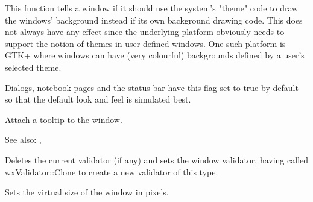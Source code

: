 




\label{wxwindowsetthemeenabled}


This function tells a window if it should use the system's "theme" code
to draw the windows' background instead if its own background drawing
code. This does not always have any effect since the underlying platform
obviously needs to support the notion of themes in user defined windows.
One such platform is GTK+ where windows can have (very colourful) backgrounds
defined by a user's selected theme.

Dialogs, notebook pages and the status bar have this flag set to true
by default so that the default look and feel is simulated best.


\label{wxwindowsettooltip}



Attach a tooltip to the window.

See also: ,


\label{wxwindowsetvalidator}


Deletes the current validator (if any) and sets the window validator, having called wxValidator::Clone to
create a new validator of this type.


\label{wxwindowsetvirtualsize}



Sets the virtual size of the window in pixels.


\label{wxwindowsetvirtualsizehints}


